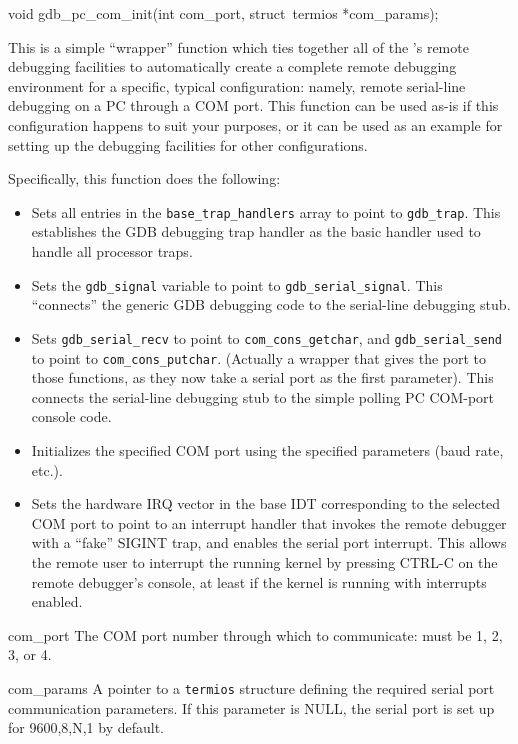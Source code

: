 \label{gdb-pc-com-init}
\begin{apisyn}

	\funcproto void gdb_pc_com_init(int com_port,
					struct~termios *com_params);
\end{apisyn}
\begin{apidesc}
	This is a simple ``wrapper'' function
	which ties together all of the \oskit{}'s remote debugging facilities
	to automatically create a complete remote debugging environment
	for a specific, typical configuration:
	namely, remote serial-line debugging on a PC through a COM port.
	This function can be used as-is
	if this configuration happens to suit your purposes,
	or it can be used as an example
	for setting up the debugging facilities for other configurations.

	Specifically, this function does the following:
	\begin{itemize}
	\item	Sets all entries in the {\tt base_trap_handlers} array
		to point to {\tt gdb_trap}.
		This establishes the GDB debugging trap handler
		as the basic handler used to handle all processor traps.
	\item	Sets the {\tt gdb_signal} variable
		to point to {\tt gdb_serial_signal}.
		This ``connects'' the generic GDB debugging code
		to the serial-line debugging stub.
	\item	Sets {\tt gdb_serial_recv} to point to {\tt com_cons_getchar},
		and {\tt gdb_serial_send} to point to {\tt com_cons_putchar}.
		(Actually a wrapper that gives the port to those functions,
		as they now take a serial port as the first parameter).
		This connects the serial-line debugging stub
		to the simple polling PC COM-port console code.
	\item	Initializes the specified COM port
		using the specified parameters (baud rate, etc.).
	\item	Sets the hardware IRQ vector in the base IDT
		corresponding to the selected COM port
		to point to an interrupt handler
		that invokes the remote debugger with a ``fake'' SIGINT trap,
		and enables the serial port interrupt.
		This allows the remote user to interrupt the running kernel
		by pressing CTRL-C on the remote debugger's console,
		at least if the kernel is running with interrupts enabled.
	\end{itemize}
\end{apidesc}
\begin{apiparm}
	\item[com_port]
		The COM port number through which to communicate:
		must be 1, 2, 3, or 4.
	\item[com_params]
		A pointer to a {\tt termios} structure
		defining the required serial port communication parameters.
		If this parameter is NULL,
		the serial port is set up for 9600,8,N,1 by default.
\end{apiparm}
